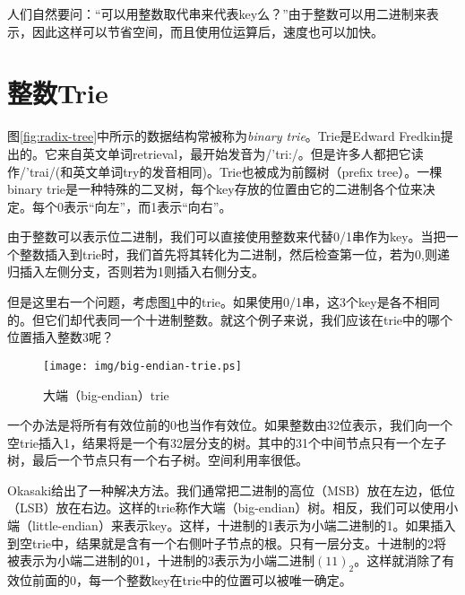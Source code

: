 \documentclass[UTF8]{article}
\begin{document}
人们自然要问：“可以用整数取代串来代表key么？”由于整数可以用二进制来表示，因此这样可以节省空间，而且使用位运算后，速度也可以加快。

\section{整数Trie}
\label{int-trie}

图\ref{fig:radix-tree}中所示的数据结构常被称为\emph{binary trie}。Trie是Edward Fredkin提出的。它来自英文单词retrieval，最开始发音为/'tri:/。但是许多人都把它读作/'trai/(和英文单词try的发音相同)\cite{wiki-trie}。Trie也被成为前餟树（prefix tree）。一棵binary trie是一种特殊的二叉树，每个key存放的位置由它的二进制各个位来决定。每个0表示“向左”，而1表示“向右”\cite{okasaki-int-map}。

由于整数可以表示位二进制，我们可以直接使用整数来代替0/1串作为key。当把一个整数插入到trie时，我们首先将其转化为二进制，然后检查第一位，若为0,则递归插入左侧分支，否则若为1则插入右侧分支。

但是这里右一个问题，考虑图\ref{fig:big-endian-trie}中的trie。如果使用0/1串，这3个key是各不相同的。但它们却代表同一个十进制整数。就这个例子来说，我们应该在trie中的哪个位置插入整数3呢？

\begin{figure}[htbp]
  \centering
  \texttt{[image: img/big-endian-trie.ps]}
  \caption{大端（big-endian）trie} \label{fig:big-endian-trie}
\end{figure}

一个办法是将所有有效位前的0也当作有效位。如果整数由32位表示，我们向一个空trie插入1，结果将是一个有32层分支的树。其中的31个中间节点只有一个左子树，最后一个节点只有一个右子树。空间利用率很低。

Okasaki给出了一种解决方法\cite{okasaki-int-map}。我们通常把二进制的高位（MSB）放在左边，低位（LSB）放在右边。这样的trie称作大端（big-endian）树。相反，我们可以使用小端（little-endian）来表示key。这样，十进制的1表示为小端二进制的1。如果插入到空trie中，结果就是含有一个右侧叶子节点的根。只有一层分支。十进制的2将被表示为小端二进制的01，十进制的3表示为小端二进制$(11)_2$。这样就消除了有效位前面的0，每一个整数key在trie中的位置可以被唯一确定。

\end{document}
